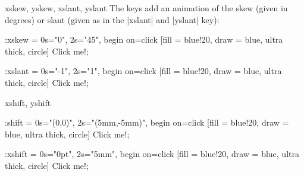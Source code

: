 \begin{tikzanimateattribute}{xskew, yskew, xslant, yslant}
    The keys add an animation of the skew (given in degrees) or slant (given as
    in the |xslant| and |yslant| key):
\begin{codeexample}[imagesource={standalone/pgfmanual-en-tikz-animations-animation-36.svg}]
\tikz \node :xskew = { 0s="0", 2s="45", begin on=click}
  [fill = blue!20, draw = blue, ultra thick, circle] {Click me!};
\end{codeexample}
\begin{codeexample}[imagesource={standalone/pgfmanual-en-tikz-animations-animation-37.svg}]
\tikz \node :xslant = { 0s="-1", 2s="1", begin on=click}
  [fill = blue!20, draw = blue, ultra thick, circle] {Click me!};
\end{codeexample}
\end{tikzanimateattribute}

\begin{tikzanimateattribute}{xshift, yshift}
\begin{codeexample}[imagesource={standalone/pgfmanual-en-tikz-animations-animation-38.svg}]
\tikz \node :shift = { 0s="{(0,0)}", 2s="{(5mm,-5mm)}",
                       begin on=click}
  [fill = blue!20, draw = blue, ultra thick, circle] {Click me!};
\end{codeexample}

\begin{codeexample}[imagesource={standalone/pgfmanual-en-tikz-animations-animation-39.svg}]
\tikz \node :xshift = { 0s="0pt", 2s="5mm", begin on=click}
  [fill = blue!20, draw = blue, ultra thick, circle] {Click me!};
\end{codeexample}
\end{tikzanimateattribute}

